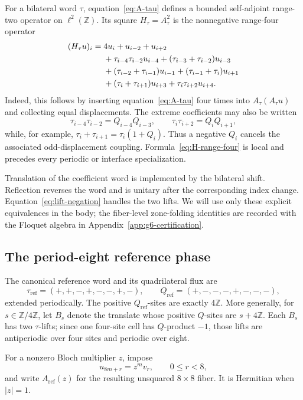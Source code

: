 For a bilateral word \(\tau\), equation~\eqref{eq:A-tau} defines a bounded
self-adjoint range-two operator on \(\ell^2(\mathbb Z)\).  Its square
\(H_\tau=A_\tau^2\) is the nonnegative range-four operator
\begin{align}
(H_\tau u)_i={}&4u_i+u_{i-2}+u_{i+2}\notag\\
&+\tau_{i-4}\tau_{i-2}u_{i-4}
+(\tau_{i-3}+\tau_{i-2})u_{i-3}\notag\\
&+(\tau_{i-2}+\tau_{i-1})u_{i-1}
+(\tau_{i-1}+\tau_i)u_{i+1}\notag\\
&+(\tau_i+\tau_{i+1})u_{i+3}
+\tau_i\tau_{i+2}u_{i+4}.
\label{eq:H-range-four}
\end{align}
Indeed, this follows by inserting equation~\eqref{eq:A-tau} four times into
\(A_\tau(A_\tau u)\) and collecting equal displacements.  The extreme
coefficients may also be written
\[
\tau_{i-4}\tau_{i-2}=Q_{i-4}Q_{i-3},
\qquad
\tau_i\tau_{i+2}=Q_iQ_{i+1},
\]
while, for example,
\(\tau_i+\tau_{i+1}=\tau_i(1+Q_i)\).  Thus a negative \(Q_i\) cancels the
associated odd-displacement coupling.  Formula~\eqref{eq:H-range-four} is
local and precedes every periodic or interface specialization.

Translation of the coefficient word is implemented by the bilateral shift.
Reflection reverses the word and is unitary after the corresponding index
change.  Equation~\eqref{eq:lift-negation} handles the two lifts.  We will
use only these explicit equivalences in the body; the fiber-level
zone-folding identities are recorded with the Floquet algebra in
Appendix~\ref{app:g6-certification}.

\subsection{The period-eight reference phase}
\label{subsec:period-eight-reference-phase}

The canonical reference word and its quadrilateral flux are
\[
\tau_{\mathrm{ref}}=(+,+,-,+,-,-,+,-),
\qquad
Q_{\mathrm{ref}}=(+,-,-,-,+,-,-,-),
\]
extended periodically.  The positive \(Q_{\mathrm{ref}}\)-sites are exactly
\(4\mathbb Z\).  More generally, for \(s\in\mathbb Z/4\mathbb Z\), let
\(B_s\) denote the translate whose positive \(Q\)-sites are
\(s+4\mathbb Z\).  Each \(B_s\) has two \(\tau\)-lifts; since one four-site
cell has \(Q\)-product \(-1\), those lifts are antiperiodic over four sites
and periodic over eight.

For a nonzero Bloch multiplier \(z\), impose
\[
u_{8m+r}=z^m v_r,\qquad 0\leq r<8,
\]
and write \(A_{\mathrm{ref}}(z)\) for the resulting unsquared \(8\times8\)
fiber.  It is Hermitian when \(|z|=1\).

